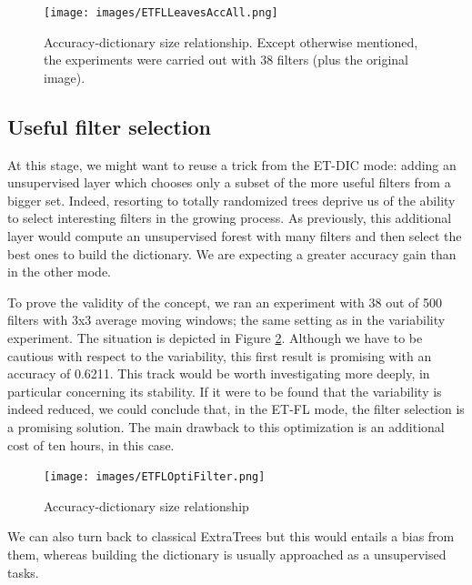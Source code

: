 \documentclass[a4paper]{report}
\begin{document}
	\begin{figure}
		\centering
			\texttt{[image: images/ETFLLeavesAccAll.png]}
		\caption{\label{fig:ETFLLeavesAccAll}Accuracy-dictionary size relationship. Except otherwise mentioned, the experiments were carried out with 38 filters (plus the original image).}
	\end{figure}
	
	\subsection{Useful filter selection}
	At this stage, we might want to reuse a trick from the ET-DIC mode: adding an unsupervised layer which chooses only a subset of the more useful filters from a bigger set. Indeed, resorting to totally randomized trees deprive us of the ability to select interesting filters in the growing process. As previously, this additional layer would compute an unsupervised forest with many filters and then select the best ones to build the dictionary. We are expecting a greater accuracy gain than in the other mode. 
	\par
	To prove the validity of the concept, we ran an experiment with 38 out of 500 filters with 3x3 average moving windows; the same setting as in the variability experiment. The situation is depicted in Figure \ref{fig:ETFLOptiFilter}. Although we have to be cautious with respect to the variability, this first result is promising with an accuracy of 0.6211. This track would be worth investigating more deeply, in particular concerning its stability. If it were to be found that the variability is indeed reduced, we could conclude that, in the ET-FL mode, the filter selection is a promising solution. The main drawback to this optimization is an additional cost of ten hours, in this case.
	
	\begin{figure}
		\centering
			\texttt{[image: images/ETFLOptiFilter.png]}
		\caption{\label{fig:ETFLOptiFilter}Accuracy-dictionary size relationship}
	\end{figure}
	
	\par
	We can also turn back to classical ExtraTrees but this would entails a bias from them, whereas building the dictionary is usually approached as a unsupervised tasks.
	
\end{document}
